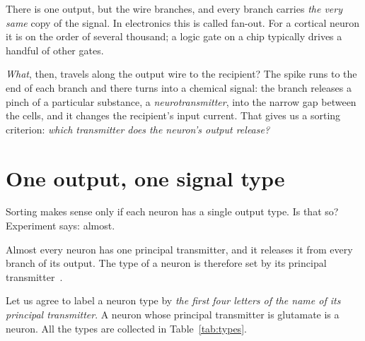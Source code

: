 There is one output, but the wire branches, and every branch carries \emph{the very same} copy of the signal. In electronics this is called fan-out. For a cortical neuron it is on the order of several thousand; a logic gate on a chip typically drives a handful of other gates.

\emph{What}, then, travels along the output wire to the recipient? The spike runs to the end of each branch and there turns into a chemical signal: the branch releases a pinch of a particular substance, a \emph{neurotransmitter}, into the narrow gap between the cells, and it changes the recipient's input current. That gives us a sorting criterion: \emph{which transmitter does the neuron's output release?}

\section{One output, one signal type}

Sorting makes sense only if each neuron has a single output type. Is that so? Experiment says: almost.

\begin{keyblock}
\begin{proposition}
\label{prop:dale}
Almost every neuron has one principal transmitter, and it releases it from every branch of its output. The type of a neuron is therefore set by its principal transmitter~\cite{Strata1999}.
\end{proposition}
\end{keyblock}

Let us agree to label a neuron type by \emph{the first four letters of the name of its principal transmitter}. A neuron whose principal transmitter is glutamate is a  neuron. All the types are collected in Table~\ref{tab:types}.

